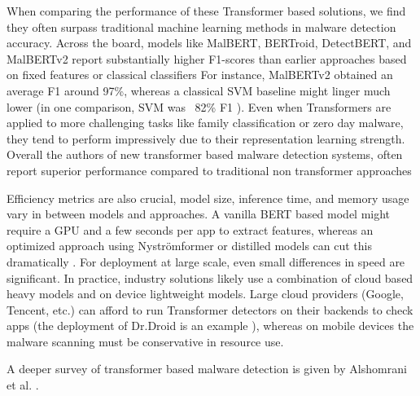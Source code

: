 When comparing the performance of these Transformer based solutions, 
we find they often surpass traditional machine learning methods in malware detection accuracy. 
Across the board, models like MalBERT, BERTroid, DetectBERT, and MalBERTv2 report substantially higher 
F1-scores than earlier approaches based on fixed features or classical classifiers
\cite{bertroid}
For instance, MalBERTv2 obtained an average F1 around 97\%, whereas a classical 
SVM baseline might linger much lower (in one comparison, SVM was ~82\% F1 \cite{malbert_two}). 
Even when Transformers are applied to more challenging tasks like family classification 
or zero day malware, they tend to perform impressively due to their representation learning strength.
Overall the authors of new transformer based malware detection systems, often report superior 
performance compared to traditional non transformer approaches \cite{detectbert,malbert_two, htgt}

Efficiency metrics are also crucial, model size, 
inference time, and memory usage vary in between models and approaches. 
A vanilla BERT based model might require a 
GPU and a few seconds per app to extract features, whereas an optimized approach using Nyströmformer 
\cite{nystromformer} 
or distilled models can cut this dramatically 
\cite{detectbert}. 
For deployment at large scale, 
even small differences in speed are significant. 
In practice, industry solutions likely use a combination of cloud based heavy models 
and on device lightweight models. 
Large cloud providers (Google, Tencent, etc.) can afford to run Transformer detectors on their 
backends to check apps (the deployment of Dr.Droid is an example
\cite{htgt}
), whereas on mobile devices the malware scanning must be conservative in resource use. 

A deeper survey of transformer based malware detection is given by Alshomrani et al. 
\cite{transformer_malware_overview}. 